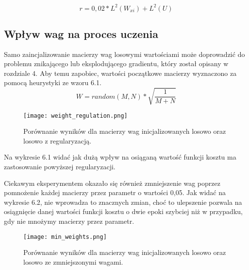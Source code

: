 \begin{equation}
r = 0,02 * L^2(W_{xi}) + L^2(U) \end{equation}

\subsection{Wpływ wag na proces uczenia}
Samo zaincjalizowanie macierzy wag losowymi wartościami może doprowadzić do problemu znikającego lub eksplodującego gradientu, który został opisany w rozdziale 4. Aby temu zapobiec, wartości początkowe macierzy wyznaczono za pomocą heurystyki ze wzoru 6.1.
\begin{equation}
W = random(M, N) * \sqrt{\frac{1}{M+N}}
\end{equation}


\label{sec:etykiety}
\begin{figure}[H]
    \centering
    \texttt{[image: weight\_regulation.png]}
    \caption{Porównanie wyników dla macierzy wag inicjalizowanych losowo oraz losowo z regularyzacją.}
\end{figure}
Na wykresie 6.1 widać jak dużą wpływ na osiąganą wartość funkcji kosztu ma zastosowanie powyższej regularyzacji.

Ciekawym eksperymentem okazało się również zmniejszenie wag poprzez pomnożenie każdej macierzy przez parametr o wartości 0,05. Jak widać na wykresie 6.2, nie wprowadza to znacznych zmian, choć to ulepszenie pozwala na osiągnięcie danej wartości funkcji kosztu o dwie epoki szybciej niż w przypadku, gdy nie mnożymy macierzy przez parametr. 

\label{sec:etykiety}
\begin{figure}[H]
    \centering
    \texttt{[image: min\_weights.png]}
    \caption{Porównanie wyników dla macierzy wag inicjalizowanych losowo oraz losowo ze zmniejszonymi wagami.}
\end{figure}


